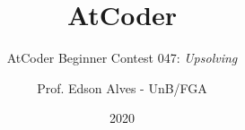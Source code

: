 \title{AtCoder}
\subtitle{AtCoder Beginner Contest 047: {\it Upsolving}}
\author{Prof. Edson Alves - UnB/FGA}
\date{2020}
